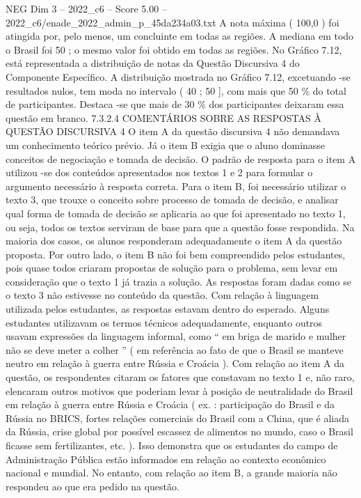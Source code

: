 \begin{textsample}{NEG Dim 3 – 2022\_c6 – Score 5.00 – 2022\_c6/enade\_2022\_admin\_p\_45da234a03.txt}
A nota máxima ( 100,0 ) foi atingida por, pelo menos, um concluinte em todas as regiões.
A mediana em todo o Brasil foi 50 ; o mesmo valor foi obtido em todas as regiões.
No Gráfico 7.12, está representada a distribuição de notas da Questão Discursiva 4 do Componente Específico.
A distribuição mostrada no Gráfico 7.12, excetuando -se resultados nulos, tem moda no intervalo ( 40 ; 50 ], com mais que 50 \% do total de participantes.
Destaca -se que mais de 30 \% dos participantes deixaram essa questão em branco. 7.3.2.4 COMENTÁRIOS SOBRE AS RESPOSTAS À QUESTÃO DISCURSIVA 4 O item A da questão discursiva 4 não demandava um conhecimento teórico prévio.
Já o item B exigia que o aluno dominasse conceitos de negociação e tomada de decisão.
O padrão de resposta para o item A utilizou -se dos conteúdos apresentados nos textos 1 e 2 para formular o argumento necessário à resposta correta.
Para o item B, foi necessário utilizar o texto 3, que trouxe o conceito sobre processo de tomada de decisão, e analisar qual forma de tomada de decisão se aplicaria ao que foi apresentado no texto 1, ou seja, todos os textos serviram de base para que a questão fosse respondida.
Na maioria dos casos, os alunos responderam adequadamente o item A da questão proposta.
Por outro lado, o item B não foi bem compreendido pelos estudantes, pois quase todos criaram propostas de solução para o problema, sem levar em consideração que o texto 1 já trazia a solução.
As respostas foram dadas como se o texto 3 não estivesse no conteúdo da questão.
Com relação à linguagem utilizada pelos estudantes, as respostas estavam dentro do esperado.
Alguns estudantes utilizavam os termos técnicos adequadamente, enquanto outros usavam expressões da linguagem informal, como “ em briga de marido e mulher não se deve meter a colher ” ( em referência ao fato de que o Brasil se manteve neutro em relação à guerra entre Rússia e Croácia ).
Com relação ao item A da questão, os respondentes citaram os fatores que constavam no texto 1 e, não raro, elencaram outros motivos que poderiam levar à posição de neutralidade do Brasil em relação à guerra entre Rússia e Croácia ( ex. : participação do Brasil e da Rússia no BRICS, fortes relações comerciais do Brasil com a China, que é aliada da Rússia, crise global por possível escassez de alimentos no mundo, caso o Brasil ficasse sem fertilizantes, etc. ).
Isso demonstra que os estudantes do campo de Administração Pública estão informados em relação ao contexto econômico nacional e mundial.
No entanto, com relação ao item B, a grande maioria não respondeu ao que era pedido na questão.

\end{textsample}
